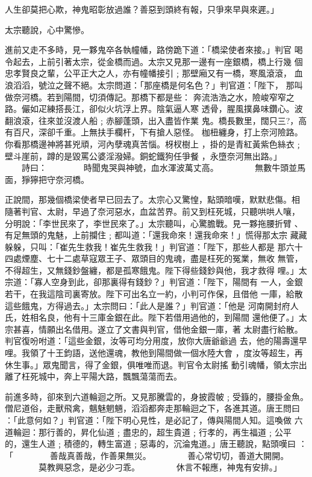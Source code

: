 \begin{pinyinscope}
{人生卻莫把心欺，神鬼昭彰放過誰？善惡到頭終有報，只爭來早與來遲。」

太宗聽說，心中驚慘。

進前又走不多時，見一夥鬼卒各執幢幡，路傍跪下道：「橋梁使者來接。」判官
喝令起去，上前引著太宗，從金橋而過。太宗又見那一邊有一座銀橋，橋上行幾
個忠孝賢良之輩，公平正大之人，亦有幢幡接引﹔那壁廂又有一橋，寒風滾滾，
血浪滔滔，號泣之聲不絕。太宗問道：「那座橋是何名色？」判官道：「陛下，
那叫做奈河橋。若到陽間，切須傳記。那橋下都是些：
奔流浩浩之水，險峻窄窄之路。儼如疋練搭長江，卻似火坑浮上界。陰氣逼人寒
透骨，腥風撲鼻味鑽心。波翻浪滾，往來並沒渡人船﹔赤腳蓬頭，出入盡皆作業
鬼。橋長數里，闊只三?，高有百尺，深卻千重。上無扶手欄杆，下有搶人惡怪。
枷杻纏身，打上奈河險路。你看那橋邊神將甚兇頑，河內孽魂真苦惱。枒杈樹上
，掛的是青紅黃紫色絲衣﹔壁斗崖前，蹲的是毀罵公婆淫潑婦。銅蛇鐵狗任爭餐
，永墮奈河無出路。」
　　詩曰：
　　　　時聞鬼哭與神號，血水渾波萬丈高。
　　　　無數牛頭並馬面，猙獰把守奈河橋。

正說間，那幾個橋梁使者早已回去了。太宗心又驚惶，點頭暗嘆，默默悲傷。相
隨著判官、太尉，早過了奈河惡水，血盆苦界。前又到枉死城，只聽哄哄人嚷，
分明說：「李世民來了，李世民來了。」太宗聽叫，心驚膽戰。見一夥拖腰折臂
、有足無頭的鬼魅，上前攔住﹔都叫道：「還我命來！還我命來！」慌得那太宗
藏藏躲躲，只叫：「崔先生救我！崔先生救我！」判官道：「陛下，那些人都是
那六十四處煙塵、七十二處草寇眾王子、眾頭目的鬼魂，盡是枉死的冤業，無收
無管，不得超生，又無錢鈔盤纏，都是孤寒餓鬼。陛下得些錢鈔與他，我才救得
哩。」太宗道：「寡人空身到此，卻那裏得有錢鈔？」判官道：「陛下，陽間有
一人，金銀若干，在我這陰司裏寄放。陛下可出名立一約，小判可作保，且借他
一庫，給散這些餓鬼，方得過去。」太宗問曰：「此人是誰？」判官道：「他是
河南開封府人氏，姓相名良，他有十三庫金銀在此。陛下若借用過他的，到陽間
還他便了。」太宗甚喜，情願出名借用。遂立了文書與判官，借他金銀一庫，著
太尉盡行給散。判官復吩咐道：「這些金銀，汝等可均分用度，放你大唐爺爺過
去，他的陽壽還早哩。我領了十王鈞語，送他還魂，教他到陽間做一個水陸大會
，度汝等超生，再休生事。」眾鬼聞言，得了金銀，俱唯唯而退。判官令太尉搖
動引魂幡，領太宗出離了枉死城中，奔上平陽大路，飄飄蕩蕩而去。

前進多時，卻來到六道輪迴之所。又見那騰雲的，身披霞帔﹔受籙的，腰掛金魚。
僧尼道俗，走獸飛禽，魑魅魍魎，滔滔都奔走那輪迴之下，各進其道。唐王問曰
：「此意何如？」判官道：「陛下明心見性，是必記了，傳與陽間人知。這喚做
六道輪迴：那行善的，昇化仙道﹔盡忠的，超生貴道﹔行孝的，再生福道﹔公平
的，還生人道﹔積德的，轉生富道﹔惡毒的，沉淪鬼道。」唐王聽說，點頭嘆曰
：「
　　　　善哉真善哉，作善果無災。
　　　　善心常切切，善道大開開。
　　　　莫教興惡念，是必少刁乖。
　　　　休言不報應，神鬼有安排。」

}
\end{pinyinscope}
